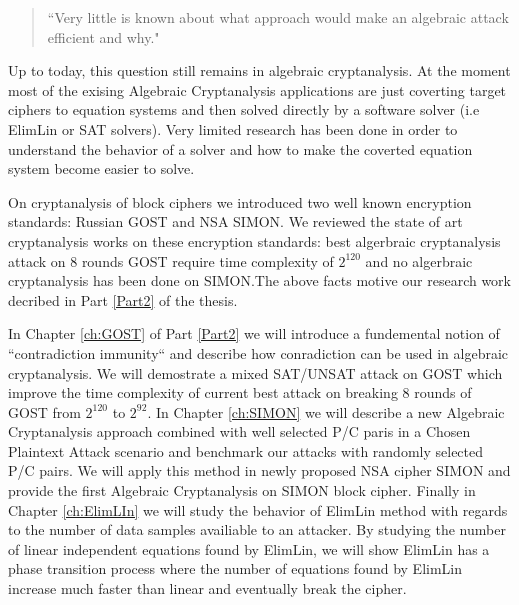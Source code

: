 \begin{quotation}
	``Very little is known about what approach would make an algebraic attack efficient and why." 
\end{quotation}


Up to today, this question still remains in algebraic cryptanalysis. At the moment most of the exising Algebraic Cryptanalysis applications are just coverting target ciphers to equation systems and then solved directly by a software solver  (i.e ElimLin or SAT solvers). Very limited research has been done in order to understand the behavior of a solver and how to make the coverted equation system become easier to solve. 

On cryptanalysis of block ciphers we introduced two well known encryption standards: Russian GOST and NSA SIMON. We reviewed the state of art cryptanalysis works on these encryption standards: best algerbraic cryptanalysis attack on 8 rounds GOST require time complexity of $2^{120}$ and no algerbraic cryptanalysis has been done on SIMON.The above facts motive our research work decribed in Part \ref{Part2} of the thesis. 

In Chapter \ref{ch:GOST} of Part \ref{Part2} we will introduce a fundemental notion of ``contradiction immunity`` and describe how conradiction can be used in algebraic cryptanalysis. We will demostrate a mixed SAT/UNSAT attack on GOST which improve the time complexity of current best attack on breaking 8 rounds of GOST from $2^{120}$ to $2^{92}$. In Chapter \ref{ch:SIMON} we will describe a new Algebraic Cryptanalysis approach combined with well selected P/C paris in a Chosen Plaintext Attack scenario and benchmark our attacks with randomly selected P/C pairs. We will apply this method in newly proposed NSA cipher SIMON and provide the first Algebraic Cryptanalysis on SIMON block cipher. Finally in Chapter \ref{ch:ElimLIn} we will study the behavior of ElimLin method with regards to the number of data samples availiable to an attacker. By studying the number of linear independent equations found by ElimLin, we will show ElimLin has a phase transition process where the number of equations found by ElimLin increase much faster than linear and eventually break the cipher.

